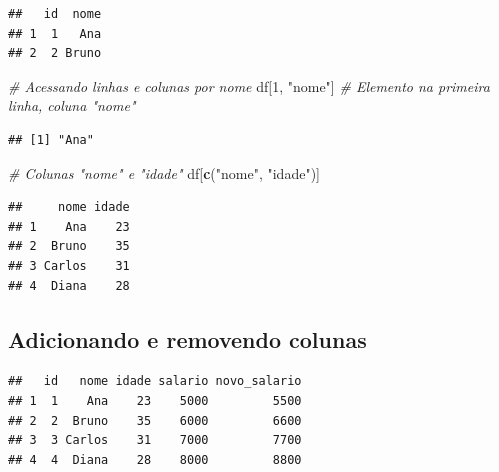 \documentclass[
]{book}
\newenvironment{Shaded}{\begin{snugshade}}{\end{snugshade}}
\newcommand{\CommentTok}[1]{\textcolor[rgb]{0.56,0.35,0.01}{\textit{#1}}}
\newcommand{\DecValTok}[1]{\textcolor[rgb]{0.00,0.00,0.81}{#1}}
\newcommand{\FloatTok}[1]{\textcolor[rgb]{0.00,0.00,0.81}{#1}}
\newcommand{\FunctionTok}[1]{\textcolor[rgb]{0.13,0.29,0.53}{\textbf{#1}}}
\newcommand{\NormalTok}[1]{#1}
\newcommand{\OtherTok}[1]{\textcolor[rgb]{0.56,0.35,0.01}{#1}}
\newcommand{\SpecialCharTok}[1]{\textcolor[rgb]{0.81,0.36,0.00}{\textbf{#1}}}
\newcommand{\StringTok}[1]{\textcolor[rgb]{0.31,0.60,0.02}{#1}}
\begin{document}
\begin{verbatim}
##   id  nome
## 1  1   Ana
## 2  2 Bruno
\end{verbatim}

\begin{Shaded}
\begin{Highlighting}[]
\CommentTok{\# Acessando linhas e colunas por nome}
\NormalTok{df[}\DecValTok{1}\NormalTok{, }\StringTok{"nome"}\NormalTok{] }\CommentTok{\# Elemento na primeira linha, coluna "nome"}
\end{Highlighting}
\end{Shaded}

\begin{verbatim}
## [1] "Ana"
\end{verbatim}

\begin{Shaded}
\begin{Highlighting}[]
\CommentTok{\# Colunas "nome" e "idade"}
\NormalTok{df[}\FunctionTok{c}\NormalTok{(}\StringTok{"nome"}\NormalTok{, }\StringTok{"idade"}\NormalTok{)] }
\end{Highlighting}
\end{Shaded}

\begin{verbatim}
##     nome idade
## 1    Ana    23
## 2  Bruno    35
## 3 Carlos    31
## 4  Diana    28
\end{verbatim}

\subsection{Adicionando e removendo colunas}\label{adicionando-e-removendo-colunas}

\begin{Shaded}
\end{Shaded}

\begin{verbatim}
##   id   nome idade salario novo_salario
## 1  1    Ana    23    5000         5500
## 2  2  Bruno    35    6000         6600
## 3  3 Carlos    31    7000         7700
## 4  4  Diana    28    8000         8800
\end{verbatim}
\end{document}
